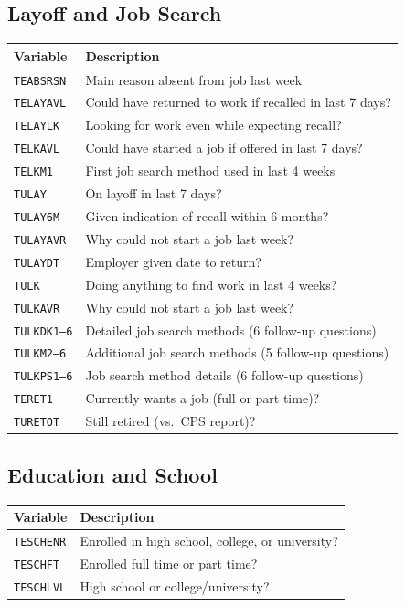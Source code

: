 \documentclass[11pt, a4paper]{article}
\begin{document}
\subsection{Layoff and Job Search}
\begin{longtable}{L{3.5cm} L{12cm}}
\toprule \textbf{Variable} & \textbf{Description} \\ \midrule \endhead
\bottomrule \endfoot
\texttt{TEABSRSN}   & Main reason absent from job last week \\
 \texttt{TELAYAVL}   & Could have returned to work if recalled in last 7 days? \\
\texttt{TELAYLK}    & Looking for work even while expecting recall? \\
 \texttt{TELKAVL}    & Could have started a job if offered in last 7 days? \\
\texttt{TELKM1}     & First job search method used in last 4 weeks \\
 \texttt{TULAY}      & On layoff in last 7 days? \\
\texttt{TULAY6M}    & Given indication of recall within 6 months? \\
 \texttt{TULAYAVR}   & Why could not start a job last week? \\
\texttt{TULAYDT}    & Employer given date to return? \\
 \texttt{TULK}       & Doing anything to find work in last 4 weeks? \\
\texttt{TULKAVR}    & Why could not start a job last week? \\
 \texttt{TULKDK1--6} & Detailed job search methods (6 follow-up questions) \\
\texttt{TULKM2--6}  & Additional job search methods (5 follow-up questions) \\
 \texttt{TULKPS1--6} & Job search method details (6 follow-up questions) \\
\texttt{TERET1}     & Currently wants a job (full or part time)? \\
 \texttt{TURETOT}    & Still retired (vs.\ CPS report)? \\
\end{longtable}

\vspace{6cm}
\subsection{Education and School}
\begin{longtable}{L{3.5cm} L{12cm}}
\toprule \textbf{Variable} & \textbf{Description} \\ \midrule \endhead
\bottomrule \endfoot
\texttt{TESCHENR} & Enrolled in high school, college, or university? \\
 \texttt{TESCHFT}  & Enrolled full time or part time? \\
\texttt{TESCHLVL} & High school or college/university? \\
\end{longtable}
\end{document}
